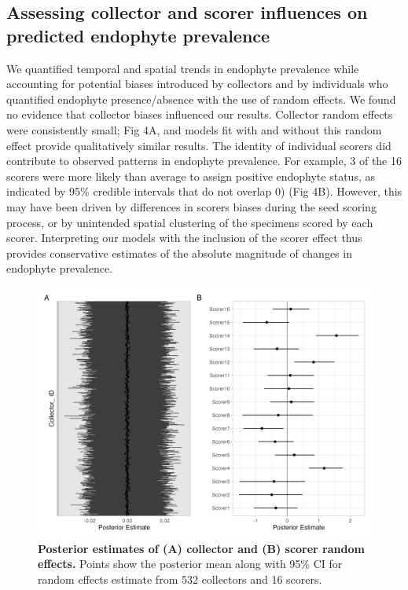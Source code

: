\documentclass[11pt]{article}
\begin{document}
\subsection*{Assessing collector and scorer influences on predicted endophyte prevalence}
We quantified temporal and spatial trends in endophyte prevalence while accounting for potential biases introduced by collectors and by individuals who quantified endophyte presence/absence with the use of random effects. 
We found no evidence that collector biases influenced our results. 
Collector random effects were consistently small; Fig 4A, and models fit with and without this random effect provide qualitatively similar results.
The identity of individual scorers did contribute to observed patterns in endophyte prevalence.
For example, 3 of the 16 scorers were more likely than average to assign positive endophyte status, as indicated by 95\% credible intervals that do not overlap 0) (Fig 4B). 
However, this may have been driven by differences in scorers biases during the seed scoring process, or by unintended spatial clustering of the specimens scored by each scorer. 
Interpreting our models with the inclusion of the scorer effect thus provides conservative estimates of the absolute magnitude of changes in endophyte prevalence.

\begin{figure}[H]
	\label{fig:random_fx}
	\centering
	\includegraphics[width = .8\linewidth]{random_fx_plot.png}
	\caption{\textbf{Posterior estimates of (A) collector and (B) scorer random effects.} Points show the posterior mean along with 95\% CI for random effects estimate from 532 collectors and 16 scorers.}
\end{figure}
\end{document}
